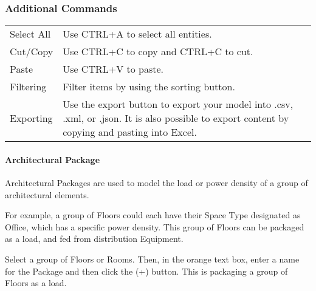 \documentclass[letterpaper,10pt,english]{sphinxmanual}
\begin{document}
\subsubsection{Additional Commands}
\label{\detokenize{docs/userguide/definingarchitecturalelements/archelements/index-arch-elements:additional-commands}}\label{\detokenize{docs/userguide/definingarchitecturalelements/archelements/index-arch-elements::doc}}

\begin{savenotes}\sphinxattablestart
\centering
\begin{tabulary}{\linewidth}[t]{|T|T|}
\hline
\sphinxstyletheadfamily 
{}
&\sphinxstyletheadfamily 
{}
\\
\hline
Select All
&
Use CTRL+A to select all entities.
\\
\hline
Cut/Copy
&
Use CTRL+C to copy and CTRL+C to cut.
\\
\hline
Paste
&
Use CTRL+V to paste.
\\
\hline
Filtering
&
Filter items by using the sorting button.
\\
\hline
Exporting
&
Use the export button to export your model into .csv, .xml, or .json.  It is also possible to export content by copying and pasting into Excel.
\\
\hline
\end{tabulary}
\par
\sphinxattableend\end{savenotes}


\paragraph{Architectural Package}
\label{\detokenize{docs/userguide/definingarchitecturalelements/archelements/index-arch-elements:architectural-package}}\label{\detokenize{docs/userguide/definingarchitecturalelements/archelements/index-arch-elements:id1}}
Architectural Packages are used to model the load or power density of a group of architectural elements.

For example, a group of Floors could each have their Space Type designated as Office, which has a specific power density.  This group of Floors can be packaged as a load, and fed from distribution Equipment.

Select a group of Floors or Rooms.  Then, in the orange text box, enter a name for the Package and then click the (+) button.  This is packaging a group of Floors as a load.
\end{document}
